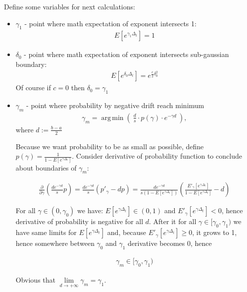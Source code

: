 \documentclass[12pt, a4paper]{article}
\DeclareMathOperator*{\argmin}{arg\,min}
\theoremstyle{remark}
\theoremstyle{definition}
\newcommand{\der}[2]{\frac{\partial #1}{\partial #2}}
\newcommand{\expp}[1]{E[e^{#1 \Delta_t}]}
\begin{document}
Define some variables for next calculations:

\begin{itemize}
    \item \(\gamma_1\) - point where math expectation of exponent intersects 1:
    \begin{align*}
        E[e^{\gamma_1 \Delta_t}] = 1
    \end{align*}
    \item \(\delta_0\) - point where math expectation of exponent intersects sub-gaussian boundary:
    \begin{align*}
        E[e^{\delta_0 \Delta_t}] = e^{\frac{c}{2}\delta_0^2}
    \end{align*}
    Of course if \(c = 0\) then \(\delta_0 = \gamma_1\)
    \item \(\gamma_m\) - point where probability by negative drift reach minimum
    \begin{align*}
        \gamma_m = \argmin \left(\ \frac{d}{s} \cdot p(\gamma) \cdot e^{-\gamma d}\ \right),
    \end{align*}
    where \(d := \frac{b - a}{2}\)

    Because we want probability to be as small as possible, define \(p(\gamma) = \frac{1}{1 - E[e^{\gamma \Delta_t}]}\). Consider derivative of probability function to conclude about boundaries of \(\gamma_m\):
    
    \begin{align*}
        \der{}{\gamma} \left(\frac{d e^{-\gamma d}}{s} p \right)= \frac{d e^{-\gamma d}}{s} \left(p'_\gamma - dp\right) = \frac{d e^{-\gamma d}}{s (1 - E[e^{\gamma \Delta_t}])} \left(\frac{E'_\gamma [e^{\gamma \Delta_t}]}{1 - E[e^{\gamma \Delta_t}]} - d\right)
    \end{align*}

    For all \(\gamma \in (0, \gamma_0)\) we have: \(\expp{\gamma} \in (0, 1)\) and \(E'_\gamma[e^{\gamma \Delta_t}] < 0\), hence derivative of probability is negative for all \(d\). After it for all \(\gamma \in [\gamma_0, \gamma_1)\) we have same limits for \(\expp{\gamma}\) and, because \(E'_\gamma[e^{\gamma \Delta_t}] \geq 0\), it grows to 1, hence somewhere between \(\gamma_0\) and \(\gamma_1\) derivative becomes 0, hence
    
    \begin{align*}
        \gamma_m \in [\gamma_0, \gamma_1)
    \end{align*}

    Obvious that \(\lim\limits_{d \to +\infty} \gamma_m = \gamma_1\).


\end{itemize}
\end{document}
